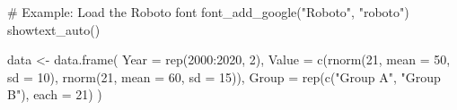 \documentclass[
  10pt,
]{scrartcl}
\newenvironment{Shaded}{\begin{snugshade}}{\end{snugshade}}
\newcommand{\AttributeTok}[1]{\textcolor[rgb]{0.40,0.45,0.13}{#1}}
\newcommand{\CommentTok}[1]{\textcolor[rgb]{0.37,0.37,0.37}{#1}}
\newcommand{\DecValTok}[1]{\textcolor[rgb]{0.68,0.00,0.00}{#1}}
\newcommand{\FunctionTok}[1]{\textcolor[rgb]{0.28,0.35,0.67}{#1}}
\newcommand{\NormalTok}[1]{\textcolor[rgb]{0.00,0.23,0.31}{#1}}
\newcommand{\OtherTok}[1]{\textcolor[rgb]{0.00,0.23,0.31}{#1}}
\newcommand{\SpecialCharTok}[1]{\textcolor[rgb]{0.37,0.37,0.37}{#1}}
\newcommand{\StringTok}[1]{\textcolor[rgb]{0.13,0.47,0.30}{#1}}
\begin{document}
\begin{Shaded}
\begin{Highlighting}[]
\CommentTok{\# Example: Load the Roboto font}
\FunctionTok{font\_add\_google}\NormalTok{(}\StringTok{"Roboto"}\NormalTok{, }\StringTok{"roboto"}\NormalTok{)}
\FunctionTok{showtext\_auto}\NormalTok{()}

\NormalTok{data }\OtherTok{\textless{}{-}} \FunctionTok{data.frame}\NormalTok{(}
  \AttributeTok{Year =} \FunctionTok{rep}\NormalTok{(}\DecValTok{2000}\SpecialCharTok{:}\DecValTok{2020}\NormalTok{, }\DecValTok{2}\NormalTok{),}
  \AttributeTok{Value =} \FunctionTok{c}\NormalTok{(}\FunctionTok{rnorm}\NormalTok{(}\DecValTok{21}\NormalTok{, }\AttributeTok{mean =} \DecValTok{50}\NormalTok{, }\AttributeTok{sd =} \DecValTok{10}\NormalTok{), }\FunctionTok{rnorm}\NormalTok{(}\DecValTok{21}\NormalTok{, }\AttributeTok{mean =} \DecValTok{60}\NormalTok{, }\AttributeTok{sd =} \DecValTok{15}\NormalTok{)),}
  \AttributeTok{Group =} \FunctionTok{rep}\NormalTok{(}\FunctionTok{c}\NormalTok{(}\StringTok{"Group A"}\NormalTok{, }\StringTok{"Group B"}\NormalTok{), }\AttributeTok{each =} \DecValTok{21}\NormalTok{)}
\NormalTok{)}


\end{Highlighting}
\end{Shaded}
\end{document}
